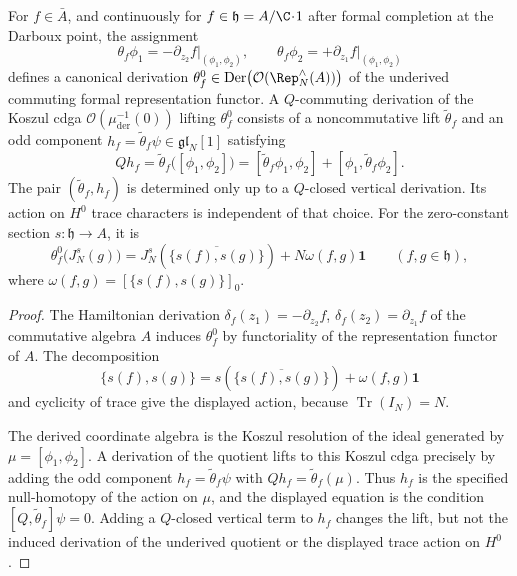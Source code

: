 \documentclass[11pt]{memoir}
\begin{document}
\begin{lem}\label{lem:hamiltonian-vector-field-on-Rep}
  For \(f\in\bar A\), and continuously for
  \(f\in\mathfrak h=A/\C\!\cdot\!1\) after formal completion at the
  Darboux point, the assignment
  \[
    \theta_f\phi_1
     =-\partial_{z_2}f\bigl|_{(\phi_1,\phi_2)},
    \qquad
    \theta_f\phi_2
     =+\partial_{z_1}f\bigl|_{(\phi_1,\phi_2)}
  \]
  defines a canonical derivation
  \(\theta_f^0\in\mathrm{Der}\bigl(\mathcal O(\Rep_N^\wedge(A))\bigr)\)
  of the underived commuting formal representation functor.  A
  \(Q\)-commuting derivation of the Koszul cdga
  \(\mathcal O(\mu^{-1}_{\mathrm{der}}(0))\) lifting \(\theta_f^0\)
  consists of a noncommutative lift \(\widetilde\theta_f\) and an odd
  component \(h_f=\widetilde\theta_f\psi\in\mathfrak{gl}_N[1]\)
  satisfying
  \[
    Qh_f
      =\widetilde\theta_f\bigl([\phi_1,\phi_2]\bigr)
      =[\widetilde\theta_f\phi_1,\phi_2]
       +[\phi_1,\widetilde\theta_f\phi_2] .
  \]
  The pair \((\widetilde\theta_f,h_f)\) is determined only up to a
  \(Q\)-closed vertical derivation.  Its action on \(H^0\) trace
  characters is independent of that choice.  For the zero-constant
  section \(s\colon\mathfrak h\to A\), it is
  \[
    \theta_f^0\bigl(J_N^s(g)\bigr)
     =J_N^s\!\left(\overline{\{s(f),s(g)\}}\right)
       +N\omega(f,g)\mathbf1
    \qquad(f,g\in\mathfrak h),
  \]
  where \(\omega(f,g)=[\{s(f),s(g)\}]_0\).
\end{lem}

\begin{proof}
  The Hamiltonian derivation
  \(\delta_f(z_1)=-\partial_{z_2}f\),
  \(\delta_f(z_2)=\partial_{z_1}f\) of the commutative algebra \(A\)
  induces \(\theta_f^0\) by functoriality of the representation
  functor of \(A\).  The decomposition
  \[
    \{s(f),s(g)\}
      =s\!\left(\overline{\{s(f),s(g)\}}\right)
       +\omega(f,g)\mathbf1
  \]
  and cyclicity of trace give the displayed action, because
  \(\operatorname{Tr}(I_N)=N\).

  The derived coordinate algebra is the Koszul resolution of the ideal
  generated by \(\mu=[\phi_1,\phi_2]\).  A derivation of the quotient
  lifts to this Koszul cdga precisely by adding the odd component
  \(h_f=\widetilde\theta_f\psi\) with
  \(Qh_f=\widetilde\theta_f(\mu)\).  Thus \(h_f\) is the specified
  null-homotopy of the action on \(\mu\), and the displayed equation is
  the condition \([Q,\widetilde\theta_f]\psi=0\).  Adding a \(Q\)-closed
  vertical term to \(h_f\) changes the lift, but not the induced
  derivation of the underived quotient or the displayed trace action on
  \(H^0\).
\end{proof}
\end{document}
